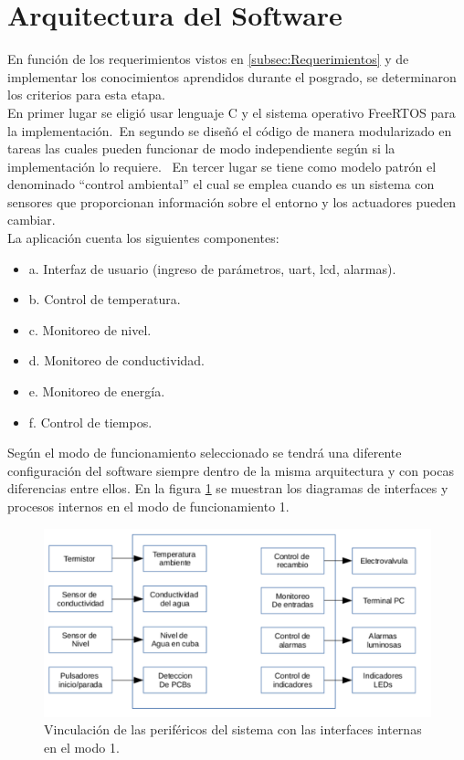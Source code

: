 \section{ Arquitectura del Software }

En función de los requerimientos vistos en \ref{subsec:Requerimientos} y de implementar los conocimientos aprendidos durante el posgrado, se determinaron los criterios para esta etapa.\\ 
En primer lugar se eligió usar lenguaje C y el sistema operativo FreeRTOS para la implementación.\
En segundo se diseñó el código de manera modularizado en tareas las cuales pueden funcionar de modo independiente según si la implementación lo requiere. \
En tercer lugar se tiene como modelo patrón el denominado \enquote{control ambiental} el cual se emplea cuando es un sistema con sensores que proporcionan información sobre el entorno y los actuadores pueden cambiar.\\

La aplicación cuenta los siguientes componentes:
\begin{itemize}
\item a. Interfaz de usuario (ingreso de parámetros, uart, lcd, alarmas).
\item b. Control de temperatura.
\item c. Monitoreo de nivel.
\item d. Monitoreo de conductividad.
\item e. Monitoreo de energía.
\item f. Control de tiempos.
\end{itemize}

Según el modo de funcionamiento seleccionado se tendrá una diferente configuración del software siempre dentro de la misma arquitectura y con pocas diferencias entre ellos. En la figura \ref{fig:diag_interfaces_m1} se muestran los diagramas de interfaces y procesos internos en el modo de funcionamiento 1. 
\begin{figure}[h!]
	\centering
	\includegraphics[width=1.0\textwidth]{Figures/Cap_3/diagrama_interfaces_1}
	\caption{ Vinculación de las periféricos del sistema con las interfaces internas en el modo 1. }
	\label{fig:diag_interfaces_m1}
\end{figure}
 
